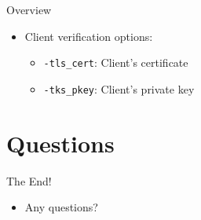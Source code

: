 \documentclass{beamer}
\begin{document}
\begin{frame}{Overview}
\begin{itemize}
	\item Client verification options:
	\begin{itemize}
		\item \texttt{-tls\_cert}: Client's certificate
		\item \texttt{-tks\_pkey}: Client's private key
	\end{itemize}
\end{itemize}
\end{frame}

\section{Questions}

\begin{frame}{The End!}
\begin{itemize}
	\item Any questions?
\end{itemize}
\end{frame}
\end{document}
